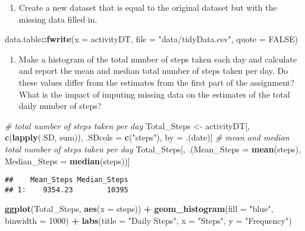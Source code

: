 \documentclass[]{article}
\newenvironment{Shaded}{\begin{snugshade}}{\end{snugshade}}
\newcommand{\KeywordTok}[1]{\textcolor[rgb]{0.13,0.29,0.53}{\textbf{#1}}}
\newcommand{\DataTypeTok}[1]{\textcolor[rgb]{0.13,0.29,0.53}{#1}}
\newcommand{\DecValTok}[1]{\textcolor[rgb]{0.00,0.00,0.81}{#1}}
\newcommand{\StringTok}[1]{\textcolor[rgb]{0.31,0.60,0.02}{#1}}
\newcommand{\CommentTok}[1]{\textcolor[rgb]{0.56,0.35,0.01}{\textit{#1}}}
\newcommand{\OtherTok}[1]{\textcolor[rgb]{0.56,0.35,0.01}{#1}}
\newcommand{\OperatorTok}[1]{\textcolor[rgb]{0.81,0.36,0.00}{\textbf{#1}}}
\newcommand{\NormalTok}[1]{#1}
\providecommand{\tightlist}{%
  \setlength{\itemsep}{0pt}\setlength{\parskip}{0pt}}
\begin{document}
\begin{enumerate}
\def\labelenumi{\arabic{enumi}.}
\setcounter{enumi}{2}
\tightlist
\item
  Create a new dataset that is equal to the original dataset but with
  the missing data filled in.
\end{enumerate}

\begin{Shaded}
\begin{Highlighting}[]
\NormalTok{data.table}\OperatorTok{::}\KeywordTok{fwrite}\NormalTok{(}\DataTypeTok{x =}\NormalTok{ activityDT, }\DataTypeTok{file =} \StringTok{"data/tidyData.csv"}\NormalTok{, }\DataTypeTok{quote =} \OtherTok{FALSE}\NormalTok{)}
\end{Highlighting}
\end{Shaded}

\begin{enumerate}
\def\labelenumi{\arabic{enumi}.}
\setcounter{enumi}{3}
\tightlist
\item
  Make a histogram of the total number of steps taken each day and
  calculate and report the mean and median total number of steps taken
  per day. Do these values differ from the estimates from the first part
  of the assignment? What is the impact of imputing missing data on the
  estimates of the total daily number of steps?
\end{enumerate}

\begin{Shaded}
\begin{Highlighting}[]
\CommentTok{# total number of steps taken per day}
\NormalTok{Total_Steps <-}\StringTok{ }\NormalTok{activityDT[, }\KeywordTok{c}\NormalTok{(}\KeywordTok{lapply}\NormalTok{(.SD, sum)), .SDcols =}\StringTok{ }\KeywordTok{c}\NormalTok{(}\StringTok{"steps"}\NormalTok{), by =}\StringTok{ }\NormalTok{.(date)] }
\CommentTok{# mean and median total number of steps taken per day}
\NormalTok{Total_Steps[, .(}\DataTypeTok{Mean_Steps =} \KeywordTok{mean}\NormalTok{(steps), }\DataTypeTok{Median_Steps =} \KeywordTok{median}\NormalTok{(steps))]}
\end{Highlighting}
\end{Shaded}

\begin{verbatim}
##    Mean_Steps Median_Steps
## 1:    9354.23        10395
\end{verbatim}

\begin{Shaded}
\begin{Highlighting}[]
\KeywordTok{ggplot}\NormalTok{(Total_Steps, }\KeywordTok{aes}\NormalTok{(}\DataTypeTok{x =}\NormalTok{ steps)) }\OperatorTok{+}\StringTok{ }\KeywordTok{geom_histogram}\NormalTok{(}\DataTypeTok{fill =} \StringTok{"blue"}\NormalTok{, }\DataTypeTok{binwidth =} \DecValTok{1000}\NormalTok{) }\OperatorTok{+}\StringTok{ }\KeywordTok{labs}\NormalTok{(}\DataTypeTok{title =} \StringTok{"Daily Steps"}\NormalTok{, }\DataTypeTok{x =} \StringTok{"Steps"}\NormalTok{, }\DataTypeTok{y =} \StringTok{"Frequency"}\NormalTok{)}
\end{Highlighting}
\end{Shaded}
\end{document}
